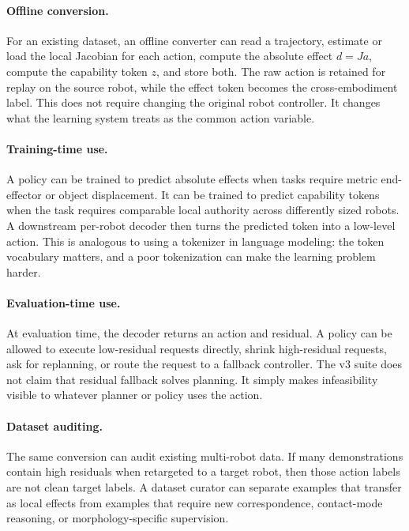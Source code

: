 \documentclass{article}
\begin{document}
\paragraph{Offline conversion.}
For an existing dataset, an offline converter can read a trajectory, estimate or load the local Jacobian for each action, compute the absolute effect $d=Ja$, compute the capability token $z$, and store both. The raw action is retained for replay on the source robot, while the effect token becomes the cross-embodiment label. This does not require changing the original robot controller. It changes what the learning system treats as the common action variable.

\paragraph{Training-time use.}
A policy can be trained to predict absolute effects when tasks require metric end-effector or object displacement. It can be trained to predict capability tokens when the task requires comparable local authority across differently sized robots. A downstream per-robot decoder then turns the predicted token into a low-level action. This is analogous to using a tokenizer in language modeling: the token vocabulary matters, and a poor tokenization can make the learning problem harder.

\paragraph{Evaluation-time use.}
At evaluation time, the decoder returns an action and residual. A policy can be allowed to execute low-residual requests directly, shrink high-residual requests, ask for replanning, or route the request to a fallback controller. The v3 suite does not claim that residual fallback solves planning. It simply makes infeasibility visible to whatever planner or policy uses the action.

\paragraph{Dataset auditing.}
The same conversion can audit existing multi-robot data. If many demonstrations contain high residuals when retargeted to a target robot, then those action labels are not clean target labels. A dataset curator can separate examples that transfer as local effects from examples that require new correspondence, contact-mode reasoning, or morphology-specific supervision.
\end{document}
